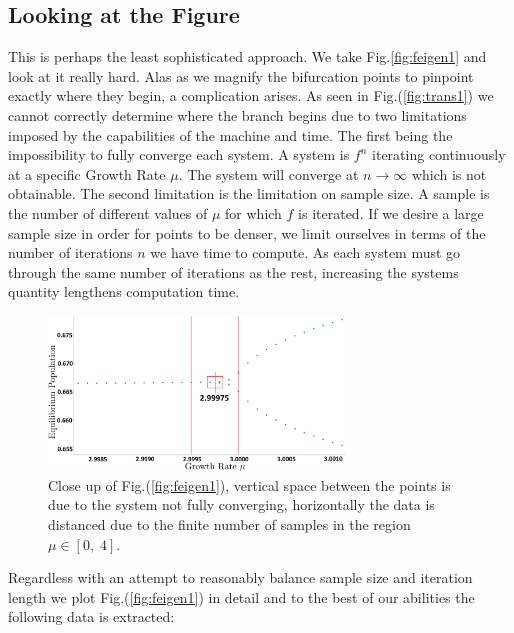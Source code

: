 \subsection{Looking at the Figure}
This is perhaps the least sophisticated approach. We take Fig.\ref{fig:feigen1} and
look at it really hard. Alas as we magnify the bifurcation points to pinpoint
exactly where they begin, a complication arises. As seen in Fig.(\ref{fig:trans1})
we cannot correctly determine where the branch begins due to two limitations imposed
by the capabilities of the machine and time. The first being the impossibility to fully
converge each system. A system is $f^n$ iterating continuously at a specific Growth Rate $\mu$.
The system will converge at $n \to \infty$ which is not obtainable.
The second limitation is the limitation on sample size. A sample is the number of different 
values of $\mu$ for which $f$ is iterated. If we desire a large sample size in order for
points to be denser, we limit ourselves in terms of the number of iterations $n$ we have
time to compute. As each system must go through the same number of iterations as the rest,
increasing the systems quantity lengthens computation time.

\begin{figure}[h]
    \centering
    \includegraphics[width=0.7\textwidth]{Images/feigen4.png}
    \caption{Close up of Fig.(\ref{fig:feigen1}), vertical space between the points
            is due to the system not fully converging, horizontally the data is distanced
            due to the finite number of samples in the region $\mu \in [0,\;4]$.}
    \label{fig:feigen3}
\end{figure}

Regardless with an attempt to reasonably balance sample size and iteration length we
plot Fig.(\ref{fig:feigen1}) in detail and to the best of our abilities the following data
is extracted:

